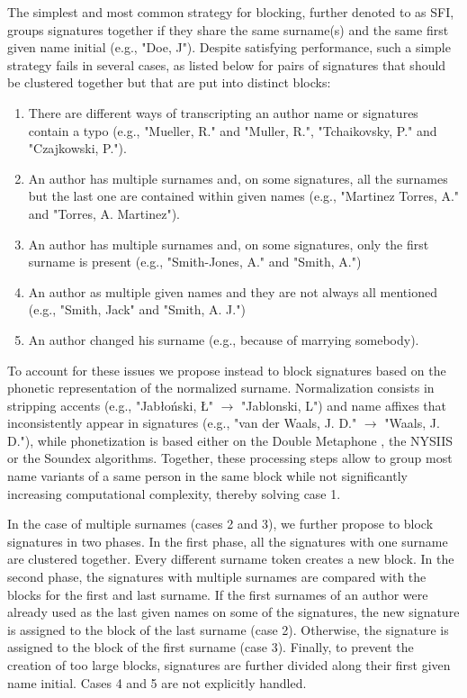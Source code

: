 \documentclass{article}
\begin{document}
The simplest and most common strategy for blocking, further denoted to as SFI,
groups signatures together if they share the same surname(s) and the same first
given name initial (e.g., "Doe, J"). Despite satisfying performance, such
a simple strategy fails in several cases, as listed below for
pairs of signatures that should be clustered together but that are put into distinct
blocks:

\begin{enumerate}
  \item There are different
  ways of transcripting an author name or signatures contain a typo
  (e.g., "Mueller, R." and "Muller, R.", "Tchaikovsky, P." and "Czajkowski, P.").

  \item An author has multiple surnames and, on some signatures, all the surnames but the
  last one are contained within given names (e.g., "Martinez Torres, A." and "Torres, A.
  Martinez").

  \item An author has multiple surnames and, on some signatures, only the first surname is
  present (e.g., "Smith-Jones, A." and "Smith, A.")

  \item An author as multiple given names and they are not always all mentioned (e.g.,
  "Smith, Jack" and "Smith, A. J.")

  \item An author changed his surname (e.g., because of marrying somebody).
\end{enumerate}

To account for these issues we propose instead to block signatures based on the
phonetic representation of the normalized surname. Normalization consists in
stripping accents (e.g., "Jabłoński, Ł" $\rightarrow$ "Jablonski, L") and name
affixes that inconsistently appear in signatures (e.g., "van der Waals, J. D."
$\rightarrow$ "Waals, J. D."), while phonetization is based either on the
Double Metaphone \citep{doublemetaphone}, the NYSIIS \citep{nysiis} or the
Soundex \citep{Soundex} algorithms. Together, these processing steps allow to
group most name variants of a same person in the same block while not
significantly increasing computational complexity, thereby solving case 1.

In the case of multiple surnames (cases 2 and 3), we further propose to block
signatures in two phases. In the first phase, all the signatures with  one
surname are clustered together. Every different surname token creates a new
block. In the second phase, the signatures  with multiple surnames are compared
with the blocks for the first and last surname.  If the first surnames of an
author were already used as the last given names on some of the signatures, the
new signature is assigned to the block of the last surname (case 2). Otherwise,
the signature is assigned to the block of the first surname (case 3). Finally,
to prevent the creation of too large blocks, signatures are further divided
along their first given name initial.  Cases 4 and 5 are not
explicitly handled.
\end{document}
